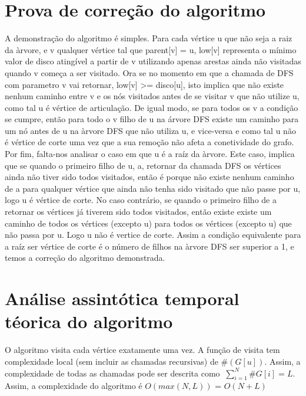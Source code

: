 \documentclass{scrartcl}
\begin{document}
\section*{Prova de correção do algoritmo}
A demonstração do algoritmo é simples. Para cada vértice u que não seja a raiz da àrvore, e v qualquer vértice tal que parent[v] = u, low[v] representa o mínimo valor de disco atingível a partir de v utilizando apenas arestas ainda não visitadas quando v começa a ser visitado. Ora se no momento em que a chamada de DFS com parametro v vai retornar, low[v] >= disco[u], isto implica que não existe nenhum caminho entre v e os nós visitados antes de se visitar v que não utilize u, como tal u é vértice de articulação. De igual modo, se para todos os v a condição se cumpre, então para todo o v filho de u na árvore DFS existe um caminho para um nó antes de u na àrvore DFS que não utiliza u, e vice-versa e como tal u não é vértice de corte uma vez que a sua remoção não afeta a conetividade do grafo. Por fim, falta-nos analisar o caso em que u é a raíz da àrvore. Este caso, implica que se quando o primeiro filho de u, a, retornar da chamada DFS os vértices ainda não tiver sido todos visitados, então é porque não existe nenhum caminho de a para qualquer vértice que ainda não tenha sido visitado que não passe por u, logo u é vértice de corte. No caso contrário, se quando o primeiro filho de a retornar os vértices já tiverem sido todos visitados, então existe existe um caminho de todos os vértices (excepto u) para todos os vértices (excepto u) que não passa por u. Logo u não é vertice de corte. Assim a condição equivalente para a raíz ser vértice de corte é o número de filhos na àrvore DFS ser superior a 1, e temos a correção do algoritmo demonstrada.

\section*{Análise assintótica temporal téorica do algoritmo}
O algoritmo visita cada vértice exatamente uma vez. A função de visita tem complexidade local (sem incluir as chamadas recursivas) de $\#(G[u])$. Assim, a complexidade de todas as chamadas pode ser descrita como $\ \sum_{i=1}^{N} \#G[i] = L$.
Assim, a complexidade do algoritmo é $O(max(N,L))$ = $O(N+L)$
\end{document}
